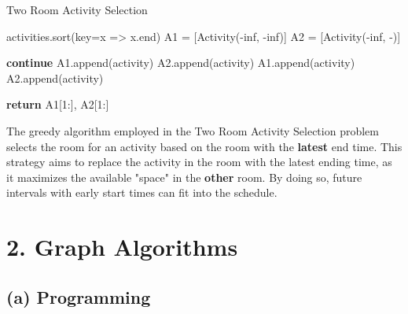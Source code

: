 \documentclass[10pt]{article}
\begin{document}
\begin{algorithm}[H]
  \caption{Two Room Activity Selection}
  \begin{algorithmic}[1]
    \State activities.sort(key=x => x.end) 
    \State A1 = [Activity(-inf, -inf)] 
    \State A2 = [Activity(-inf, -)] 

    \State \textbf{continue} 
    \State A1.append(activity) 
    \State A2.append(activity) 
    \State A1.append(activity)
    \Else
    \State A2.append(activity)
    \EndIf
    \EndIf
    \EndFor

    \State \textbf{return} A1[1:], A2[1:] 
    \EndProcedure
  \end{algorithmic}
\end{algorithm}

The greedy algorithm employed in the Two Room Activity Selection problem selects the room for an activity based on the room with the \textbf{latest} end time. This strategy aims to replace the activity in the room with the latest ending time, as it maximizes the available "space" in the \textbf{other} room. By doing so, future intervals with early start times can fit into the schedule.

\section*{2. Graph Algorithms}

\subsection*{(a) Programming}
\end{document}
